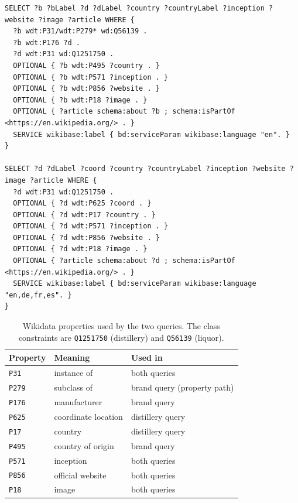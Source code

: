 \begin{lstlisting}[frame=single, basicstyle=\ttfamily\scriptsize, breaklines=true,
    caption={The two Wikidata collection queries: spirit brands (top) and
    distilleries (bottom).},
    label={lst:wikidata-queries}]
SELECT ?b ?bLabel ?d ?dLabel ?country ?countryLabel ?inception ?website ?image ?article WHERE {
  ?b wdt:P31/wdt:P279* wd:Q56139 .
  ?b wdt:P176 ?d .
  ?d wdt:P31 wd:Q1251750 .
  OPTIONAL { ?b wdt:P495 ?country . }
  OPTIONAL { ?b wdt:P571 ?inception . }
  OPTIONAL { ?b wdt:P856 ?website . }
  OPTIONAL { ?b wdt:P18 ?image . }
  OPTIONAL { ?article schema:about ?b ; schema:isPartOf <https://en.wikipedia.org/> . }
  SERVICE wikibase:label { bd:serviceParam wikibase:language "en". }
}

SELECT ?d ?dLabel ?coord ?country ?countryLabel ?inception ?website ?image ?article WHERE {
  ?d wdt:P31 wd:Q1251750 .
  OPTIONAL { ?d wdt:P625 ?coord . }
  OPTIONAL { ?d wdt:P17 ?country . }
  OPTIONAL { ?d wdt:P571 ?inception . }
  OPTIONAL { ?d wdt:P856 ?website . }
  OPTIONAL { ?d wdt:P18 ?image . }
  OPTIONAL { ?article schema:about ?d ; schema:isPartOf <https://en.wikipedia.org/> . }
  SERVICE wikibase:label { bd:serviceParam wikibase:language "en,de,fr,es". }
}
\end{lstlisting}

\begin{table}[h]
  \centering
  \small
  \begin{tabular}{@{}lll@{}}
    \toprule
    Property & Meaning & Used in \\
    \midrule
    \texttt{P31} & instance of & both queries \\
    \texttt{P279} & subclass of & brand query (property path) \\
    \texttt{P176} & manufacturer & brand query \\
    \texttt{P625} & coordinate location & distillery query \\
    \texttt{P17} & country & distillery query \\
    \texttt{P495} & country of origin & brand query \\
    \texttt{P571} & inception & both queries \\
    \texttt{P856} & official website & both queries \\
    \texttt{P18} & image & both queries \\
    \bottomrule
  \end{tabular}
  \caption{Wikidata properties used by the two queries. The class constraints
  are \texttt{Q1251750} (distillery) and \texttt{Q56139} (liquor).}
  \label{tab:wikidata-props}
\end{table}

